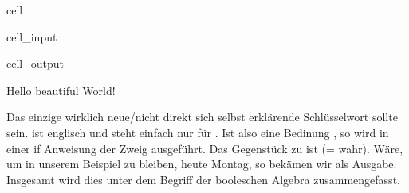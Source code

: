 \documentclass[letterpaper,10pt,english]{jupyterBook}
\begin{document}
\begin{sphinxuseclass}{cell}\begin{sphinxVerbatimInput}

\begin{sphinxuseclass}{cell_input}
\begin{sphinxVerbatim}[commandchars=\\\{\}]
 
      
    
     
        
\end{sphinxVerbatim}

\end{sphinxuseclass}\end{sphinxVerbatimInput}
\begin{sphinxVerbatimOutput}

\begin{sphinxuseclass}{cell_output}
\begin{sphinxVerbatim}[commandchars=\\\{\}]
Hello beautiful World!
\end{sphinxVerbatim}

\end{sphinxuseclass}\end{sphinxVerbatimOutput}

\end{sphinxuseclass}
\sphinxAtStartPar
Das einzige wirklich neue/nicht direkt sich selbst erklärende Schlüsselwort sollte  sein.  ist englisch und steht einfach nur für . Ist also eine Bedinung , so wird in einer if \sphinxhyphen{} Anweisung der \sphinxhyphen{}Zweig ausgeführt. Das Gegenstück zu  ist  (= wahr). Wäre, um in unserem Beispiel zu bleiben, heute Montag, so bekämen wir  als Ausgabe. Insgesamt wird dies unter dem Begriff der booleschen Algebra zusammengefasst.
\end{document}
